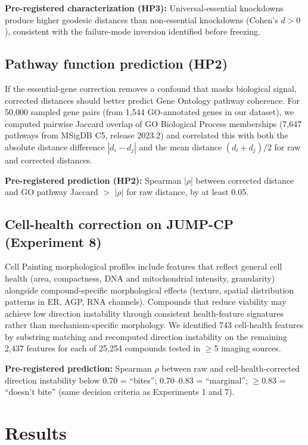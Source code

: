 \documentclass{article}
\begin{document}
\textbf{Pre-registered characterization (HP3):} Universal-essential
knockdowns produce higher geodesic distances than non-essential knockdowns
(Cohen's $d > 0$), consistent with the failure-mode inversion identified
before freezing.

\subsection{Pathway function prediction (HP2)}

If the essential-gene correction removes a confound that masks biological
signal, corrected distances should better predict Gene Ontology pathway
coherence. For 50{,}000 sampled gene pairs (from 1{,}544 GO-annotated genes
in our dataset), we computed pairwise Jaccard overlap of GO Biological
Process memberships (7{,}647 pathways from MSigDB C5, release 2023.2) and
correlated this with both the absolute distance difference $|d_i - d_j|$
and the mean distance $(d_i + d_j)/2$ for raw and corrected distances.

\textbf{Pre-registered prediction (HP2):} Spearman $|\rho|$ between corrected
distance and GO pathway Jaccard $>$ $|\rho|$ for raw distance, by at least
0.05.

\subsection{Cell-health correction on JUMP-CP (Experiment 8)}

Cell Painting morphological profiles include features that reflect general
cell health (area, compactness, DNA and mitochondrial intensity, granularity)
alongside compound-specific morphological effects (texture, spatial
distribution patterns in ER, AGP, RNA channels). Compounds that reduce
viability may achieve low direction instability through consistent
health-feature signatures rather than mechanism-specific morphology. We
identified 743 cell-health features by substring matching and recomputed
direction instability on the remaining 2{,}437 features for each of 25{,}254
compounds tested in $\geq$5 imaging sources.

\textbf{Pre-registered prediction:} Spearman $\rho$ between raw and
cell-health-corrected direction instability below 0.70 = ``bites'';
0.70--0.83 = ``marginal''; $\geq 0.83$ = ``doesn't bite'' (same decision
criteria as Experiments 1 and 7).

\section{Results}
\end{document}

